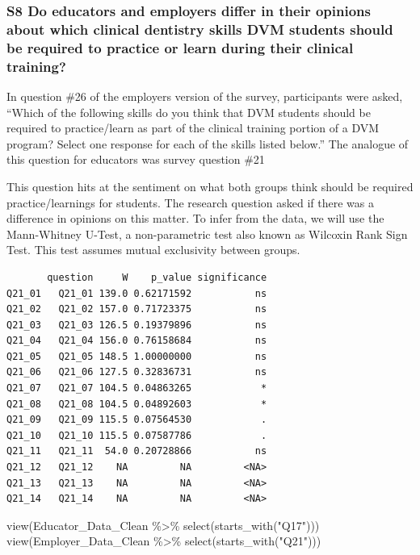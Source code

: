 \documentclass[
  11pt,
  letterpaper,
  DIV=11,
  numbers=noendperiod]{scrartcl}
\newenvironment{Shaded}{\begin{snugshade}}{\end{snugshade}}
\newcommand{\FunctionTok}[1]{\textcolor[rgb]{0.28,0.35,0.67}{#1}}
\newcommand{\NormalTok}[1]{\textcolor[rgb]{0.00,0.23,0.31}{#1}}
\newcommand{\SpecialCharTok}[1]{\textcolor[rgb]{0.37,0.37,0.37}{#1}}
\newcommand{\StringTok}[1]{\textcolor[rgb]{0.13,0.47,0.30}{#1}}
\numberwithin{figure}{section}
\begin{document}
\hypertarget{s8-do-educators-and-employers-differ-in-their-opinions-about-which-clinical-dentistry-skills-dvm-students-should-be-required-to-practice-or-learn-during-their-clinical-training}{%
\subsubsection{S8 Do educators and employers differ in their opinions
about which clinical dentistry skills DVM students should be required to
practice or learn during their clinical
training?}\label{s8-do-educators-and-employers-differ-in-their-opinions-about-which-clinical-dentistry-skills-dvm-students-should-be-required-to-practice-or-learn-during-their-clinical-training}}

In question \#26 of the employers version of the survey, participants
were asked, ``Which of the following skills do you think that DVM
students should be required to practice/learn as part of the clinical
training portion of a DVM program? Select one response for each of the
skills listed below.'' The analogue of this question for educators was
survey question \#21

This question hits at the sentiment on what both groups think should be
required practice/learnings for students. The research question asked if
there was a difference in opinions on this matter. To infer from the
data, we will use the Mann-Whitney U-Test, a non-parametric test also
known as Wilcoxin Rank Sign Test. This test assumes mutual exclusivity
between groups.

\begin{verbatim}
       question     W    p_value significance
Q21_01   Q21_01 139.0 0.62171592           ns
Q21_02   Q21_02 157.0 0.71723375           ns
Q21_03   Q21_03 126.5 0.19379896           ns
Q21_04   Q21_04 156.0 0.76158684           ns
Q21_05   Q21_05 148.5 1.00000000           ns
Q21_06   Q21_06 127.5 0.32836731           ns
Q21_07   Q21_07 104.5 0.04863265            *
Q21_08   Q21_08 104.5 0.04892603            *
Q21_09   Q21_09 115.5 0.07564530            .
Q21_10   Q21_10 115.5 0.07587786            .
Q21_11   Q21_11  54.0 0.20728866           ns
Q21_12   Q21_12    NA         NA         <NA>
Q21_13   Q21_13    NA         NA         <NA>
Q21_14   Q21_14    NA         NA         <NA>
\end{verbatim}

\begin{Shaded}
\begin{Highlighting}[]
\FunctionTok{view}\NormalTok{(Educator\_Data\_Clean }\SpecialCharTok{\%\textgreater{}\%} \FunctionTok{select}\NormalTok{(}\FunctionTok{starts\_with}\NormalTok{(}\StringTok{"Q17"}\NormalTok{)))}
\FunctionTok{view}\NormalTok{(Employer\_Data\_Clean }\SpecialCharTok{\%\textgreater{}\%} \FunctionTok{select}\NormalTok{(}\FunctionTok{starts\_with}\NormalTok{(}\StringTok{"Q21"}\NormalTok{)))}
\end{Highlighting}
\end{Shaded}
\end{document}
